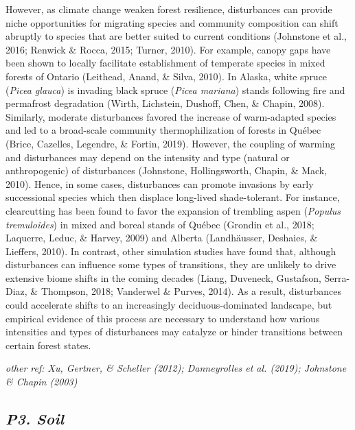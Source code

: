 \documentclass[a4paperpaper,]{article}
\begin{document}
However, as climate change weaken forest resilience, disturbances can
provide niche opportunities for migrating species and community
composition can shift abruptly to species that are better suited to
current conditions (Johnstone et al., 2016; Renwick \& Rocca, 2015;
Turner, 2010). For example, canopy gaps have been shown to locally
facilitate establishment of temperate species in mixed forests of
Ontario (Leithead, Anand, \& Silva, 2010). In Alaska, white spruce
(\emph{Picea glauca}) is invading black spruce (\emph{Picea mariana})
stands following fire and permafrost degradation (Wirth, Lichstein,
Dushoff, Chen, \& Chapin, 2008). Similarly, moderate disturbances
favored the increase of warm-adapted species and led to a broad-scale
community thermophilization of forests in Québec (Brice, Cazelles,
Legendre, \& Fortin, 2019). However, the coupling of warming and
disturbances may depend on the intensity and type (natural or
anthropogenic) of disturbances (Johnstone, Hollingsworth, Chapin, \&
Mack, 2010). Hence, in some cases, disturbances can promote invasions by
early successional species which then displace long-lived
shade-tolerant. For instance, clearcutting has been found to favor the
expansion of trembling aspen (\emph{Populus tremuloides}) in mixed and
boreal stands of Québec (Grondin et al., 2018; Laquerre, Leduc, \&
Harvey, 2009) and Alberta (Landhäusser, Deshaies, \& Lieffers, 2010). In
contrast, other simulation studies have found that, although
disturbances can influence some types of transitions, they are unlikely
to drive extensive biome shifts in the coming decades (Liang, Duveneck,
Gustafson, Serra-Diaz, \& Thompson, 2018; Vanderwel \& Purves, 2014). As
a result, disturbances could accelerate shifts to an increasingly
deciduous‐dominated landscape, but empirical evidence of this process
are necessary to understand how various intensities and types of
disturbances may catalyze or hinder transitions between certain forest
states.

\emph{other ref: Xu, Gertner, \& Scheller (2012); Danneyrolles et al.
(2019); Johnstone \& Chapin (2003)}

\hypertarget{p3.-soil}{%
\subsection{\texorpdfstring{\emph{P3. Soil}}{P3. Soil}}\label{p3.-soil}}
\end{document}
